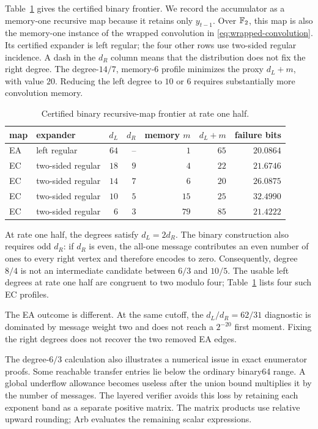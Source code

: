 Table~\ref{tab:binary-recursive-map-frontier} gives the certified binary
frontier.  We record the accumulator as a memory-one recursive map because it
retains only $y_{t-1}$.  Over $\mathbb F_2$, this map is also the memory-one instance
of the wrapped convolution in \eqref{eq:wrapped-convolution}.  Its certified
expander is left regular; the four other rows use two-sided regular incidence.
A dash in the $d_R$ column means that the distribution does not fix the right
degree.
The degree-$14/7$, memory-$6$ profile minimizes the proxy $d_L+m$, with value
$20$.  Reducing the left degree to $10$ or $6$ requires substantially more
convolution memory.

\begin{table}[t]
\centering
\caption{Certified binary recursive-map frontier at rate one half.}
\label{tab:binary-recursive-map-frontier}
\begin{tabular}{@{}llrrrrr@{}}
\toprule
map & expander & $d_L$ & $d_R$ & memory $m$ & $d_L+m$ & failure bits \\
\midrule
EA & left regular & $64$ & -- & $1$  & $65$ & $20.0864$ \\
EC & two-sided regular & $18$ & $9$ & $4$  & $22$ & $21.6746$ \\
EC & two-sided regular & $14$ & $7$ & $6$  & $20$ & $26.0875$ \\
EC & two-sided regular & $10$ & $5$ & $15$ & $25$ & $32.4990$ \\
EC & two-sided regular & $6$  & $3$ & $79$ & $85$ & $21.4222$ \\
\bottomrule
\end{tabular}
\end{table}

At rate one half, the degrees satisfy $d_L=2d_R$.  The binary construction
also requires odd $d_R$: if $d_R$ is even, the all-one message contributes an
even number of ones to every right vertex and therefore encodes to zero.
Consequently, degree $8/4$ is not an intermediate candidate between $6/3$
and $10/5$.  The usable left degrees at rate one half are congruent to two
modulo four; Table~\ref{tab:binary-recursive-map-frontier} lists four such EC
profiles.

The EA outcome is different.  At the same cutoff, the $d_L/d_R=62/31$
diagnostic is dominated by message weight two and does not reach a $2^{-20}$
first moment.  Fixing the right degrees does not recover the two removed EA
edges.

The degree-$6/3$ calculation also illustrates a numerical issue in exact
enumerator proofs.  Some reachable transfer entries lie below the ordinary
binary64 range.  A global underflow allowance becomes useless after the union
bound multiplies it by the number of messages.  The layered verifier avoids
this loss by retaining each exponent band as a separate positive matrix.
The matrix products use relative upward rounding; Arb evaluates the remaining
scalar expressions.


